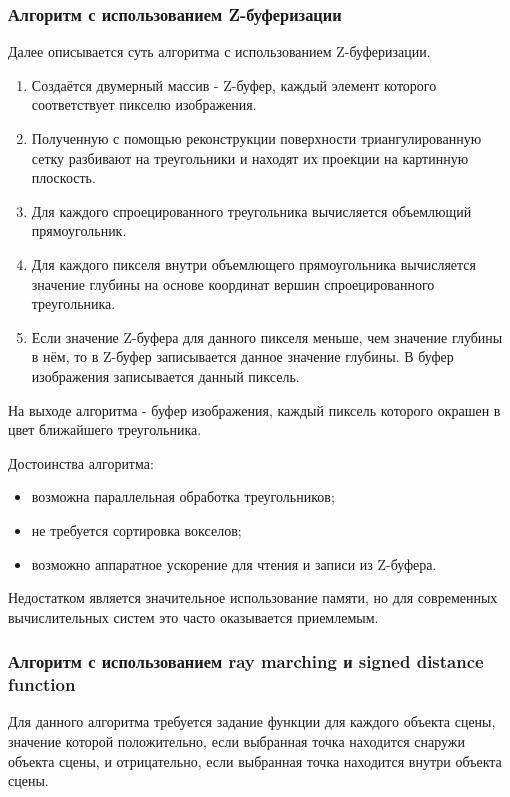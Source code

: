 \subsubsection{Алгоритм с использованием Z-буферизации}

Далее описывается суть алгоритма с использованием Z-буферизации.

\begin{enumerate}
    \item Создаётся двумерный массив - Z-буфер, каждый элемент которого соответствует
    пикселю изображения.
    \item Полученную с помощью реконструкции поверхности триангулированную сетку разбивают на
    треугольники и находят их проекции на картинную плоскость.
    \item Для каждого спроецированного
    треугольника вычисляется объемлющий прямоугольник.
    \item Для каждого пикселя внутри объемлющего прямоугольника вычисляется значение глубины на основе координат вершин спроецированного треугольника.
    \item Если значение Z-буфера для данного пикселя меньше, чем значение глубины в нём, то в Z-буфер записывается данное значение глубины. В буфер изображения записывается данный пиксель.
\end{enumerate}

На выходе алгоритма - буфер изображения, каждый пиксель которого окрашен в цвет ближайшего треугольника.

Достоинства алгоритма:
\begin{itemize}
    \item возможна параллельная обработка треугольников;
    \item не требуется сортировка вокселов;
    \item возможно аппаратное ускорение для чтения и записи из Z-буфера.
\end{itemize}

Недостатком является значительное использование памяти, но для современных
вычислительных систем это часто оказывается приемлемым\cite{site:depthbuffer}.

\subsubsection{Алгоритм с использованием ray marching и signed distance function}

Для данного алгоритма требуется задание функции для каждого объекта сцены,
 значение которой положительно, если выбранная точка находится снаружи объекта сцены,
 и отрицательно, если выбранная точка находится внутри объекта сцены.


